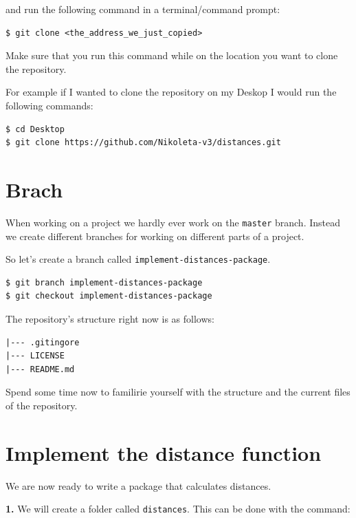 \documentclass[11pt]{article}
\begin{document}
and run the following command in a terminal/command prompt:

\begin{verbatim}
$ git clone <the_address_we_just_copied>
\end{verbatim}

Make sure that you run this command while on the location you want to
clone the repository.

For example if I wanted to clone the repository on my Deskop I would run
the following commands:

\begin{verbatim}
$ cd Desktop
$ git clone https://github.com/Nikoleta-v3/distances.git
\end{verbatim}

    \hypertarget{brach}{%
\section{Brach}\label{brach}}

When working on a project we hardly ever work on the \texttt{master}
branch. Instead we create different branches for working on different
parts of a project.

So let's create a branch called \texttt{implement-distances-package}.

\begin{verbatim}
$ git branch implement-distances-package
$ git checkout implement-distances-package
\end{verbatim}

    The repository's structure right now is as follows:

\begin{verbatim}
|--- .gitingore
|--- LICENSE   
|--- README.md
\end{verbatim}

Spend some time now to familirie yourself with the structure and the
current files of the repository.

    \hypertarget{implement-the-distance-function}{%
\section{Implement the distance
function}\label{implement-the-distance-function}}

We are now ready to write a package that calculates distances.

\textbf{1.} We will create a folder called \texttt{distances}. This can
be done with the command:
\end{document}
